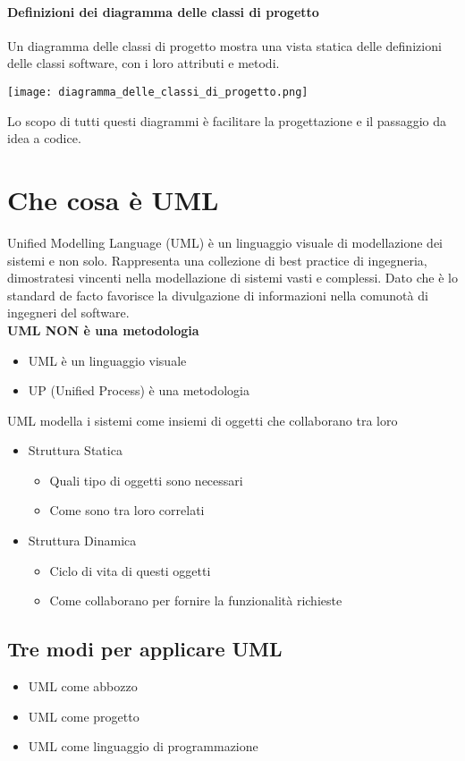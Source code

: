 \paragraph*{Definizioni dei diagramma delle classi di progetto}
Un diagramma delle classi di progetto mostra una vista statica delle definizioni
delle classi software, con i loro attributi e metodi.
\begin{center}
    \texttt{[image: diagramma\_delle\_classi\_di\_progetto.png]}
\end{center}
Lo scopo di tutti questi diagrammi è facilitare la progettazione e il passaggio
da idea a codice.
\section{Che cosa è UML}
Unified Modelling Language (UML) è un linguaggio visuale di modellazione
dei sistemi e non solo.
Rappresenta una collezione di best practice di ingegneria, dimostratesi vincenti
nella modellazione di sistemi vasti e complessi. Dato che è lo standard de facto
favorisce la divulgazione di informazioni nella comunotà di ingegneri del software.
\\ \textbf{UML NON è una metodologia}
\begin{itemize}
    \item UML è un linguaggio visuale
    \item UP (Unified Process) è una metodologia
\end{itemize}
UML modella i sistemi come insiemi di oggetti che collaborano tra loro
\begin{itemize}
    \item Struttura Statica \begin{itemize}
        \item Quali tipo di oggetti sono necessari
        \item Come sono tra loro correlati
    \end{itemize}
    \item Struttura Dinamica \begin{itemize}
        \item Ciclo di vita di questi oggetti
        \item Come collaborano per fornire la funzionalità richieste
    \end{itemize}
\end{itemize}
\subsection{Tre modi per applicare UML}
\begin{itemize}
    \item UML come abbozzo
    \item UML come progetto
    \item UML come linguaggio di programmazione
\end{itemize}
